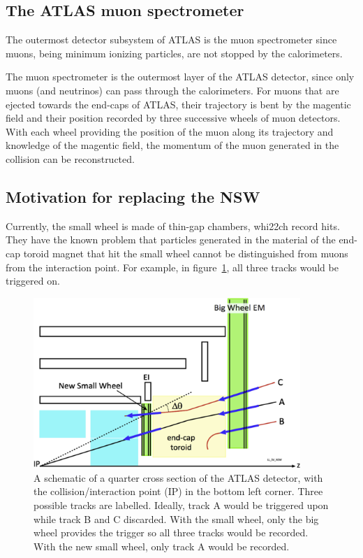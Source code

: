 \subsection{The ATLAS muon spectrometer}
The outermost detector subsystem of ATLAS is the muon spectrometer since muons, being minimum ionizing particles, are not stopped by the calorimeters.

The muon spectrometer is the outermost layer of the ATLAS detector, since only muons (and neutrinos) can pass through the calorimeters. For muons that are ejected towards the end-caps of ATLAS, their trajectory is bent by the magentic field and their position recorded by three successive wheels of muon detectors. With each wheel providing the position of the muon along its trajectory and knowledge of the magentic field, the momentum of the muon generated in the collision can be reconstructed. 

\subsection{Motivation for replacing the NSW}
Currently, the small wheel is made of thin-gap chambers, whi22ch record hits. They have the known problem that particles generated in the material of the end-cap toroid magnet that hit the small wheel cannot be distinguished from muons from the interaction point. For example, in figure~\ref{fig:nsw_track_triggering}, all three tracks would be triggered on.

\begin{figure}
    \centering
    \includegraphics[width = 0.9\textwidth]{figures/perez-codina_NSW_tracks.jpg}
    \caption{A schematic of a quarter cross section of the ATLAS detector, with the collision/interaction point (IP) in the bottom left corner. Three possible tracks are labelled. Ideally, track A would be triggered upon while track B and C discarded. With the small wheel, only the big wheel provides the trigger so all three tracks would be recorded. With the new small wheel, only track A would be recorded.}
    \label{fig:nsw_track_triggering}
\end{figure}



